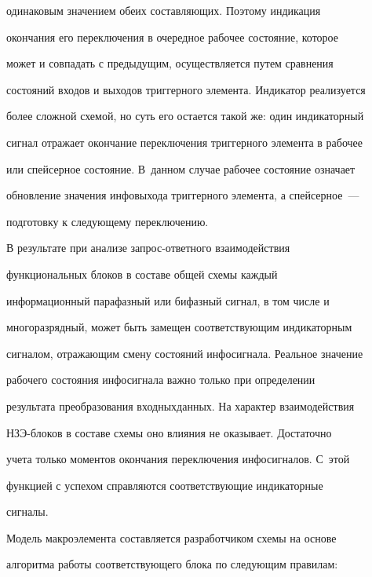 одинаковым значением обеих составляющих. Поэтому индикация


окончания его переключения в очередное рабочее состояние, которое


может и совпадать с предыдущим, осуществляется путем сравнения


состояний входов и выходов триггерного элемента. Индикатор реализуется


более сложной схемой, но суть его остается такой же: один индикаторный


сигнал отражает окончание переключения триггерного элемента в рабочее


или спейсерное состояние. В~данном случае рабочее состояние означает


обновление значения инфовыхода триггерного элемента, а спейсерное~---


подготовку к следующему переключению.





   В результате при анализе за\-прос-от\-вет\-но\-го взаимодействия


функциональных блоков в составе общей схемы каждый


информационный парафазный или бифазный сигнал, в том числе и


многоразрядный, может быть замещен соответствующим индикаторным


сигналом, отражающим смену состояний инфо\-сиг\-на\-ла. Реальное значение


рабочего состояния инфосигнала важно толь\-ко при определении


результата преобразования входных\linebreak данных. На характер взаимодействия


НЗЭ-бло\-ков в составе схемы оно влияния не оказывает. Достаточно


учета только моментов окончания переключения инфосигналов. С~этой


функцией с успехом справляются соответствующие индикаторные\linebreak 


сигналы.





   Модель макроэлемента составляется разработчиком схемы на основе


алгоритма работы соответствующего блока по следующим правилам:


